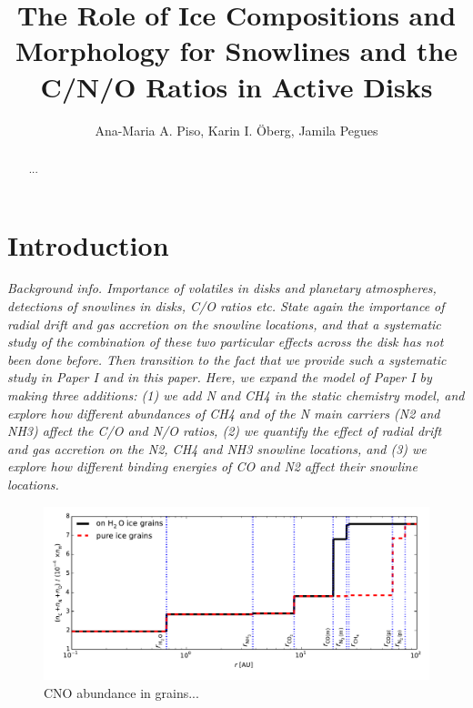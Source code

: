 \documentclass[apj]{emulateapj}
\newcommand{\emgr}[1]{\emph{ \color{gray} #1}}
\begin{document}


\title{The Role of Ice Compositions and Morphology for Snowlines and the C/N/O Ratios in Active Disks}

\author{Ana-Maria A. Piso, Karin I. \"Oberg, Jamila Pegues}


\begin{abstract}
...
\end{abstract}

\section{Introduction}

\emgr{Background info. Importance of volatiles in disks and planetary atmospheres, detections of snowlines in disks, C/O ratios etc. State again the importance of radial drift and gas accretion on the snowline locations, and that a systematic study of the combination of these two particular effects across the disk has not been done before. Then transition to the fact that we provide such a systematic study in Paper I and in this paper. Here, we expand the model of Paper I by making three additions: (1) we add N and CH4 in the static chemistry model, and explore how different abundances of CH4 and of the N main carriers (N2 and NH3) affect the C/O  and N/O ratios, (2) we quantify the effect of radial drift and gas accretion on the N2, CH4 and NH3 snowline locations, and (3) we explore how different binding energies of CO and N2 affect their snowline locations.}

\begin{figure}[h!]
\centering
\includegraphics[width=\textwidth]{../../figs/CNO_and_snowlines.pdf}
\caption{CNO abundance in grains...} 
\label{fig:COstatic}
\end{figure}
\end{document}
